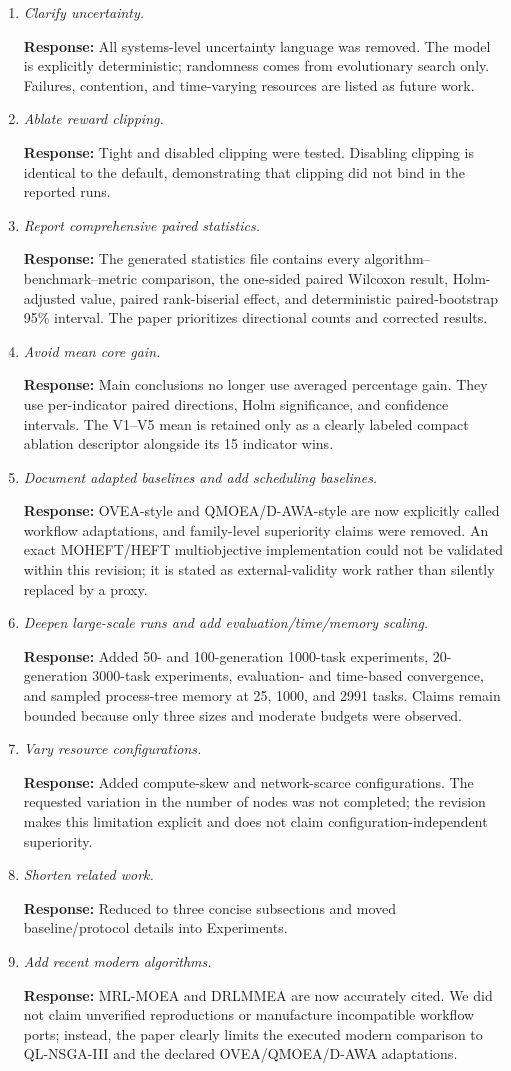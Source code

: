 \documentclass[11pt]{article}
\newcommand{\response}[1]{\par\smallskip\noindent\textcolor{blue!55!black}{\textbf{Response:} #1}\par\medskip}
\begin{document}
\begin{enumerate}
\item \emph{Clarify uncertainty.}
\response{All systems-level uncertainty language was removed. The model is explicitly deterministic; randomness comes from evolutionary search only. Failures, contention, and time-varying resources are listed as future work.}

\item \emph{Ablate reward clipping.}
\response{Tight and disabled clipping were tested. Disabling clipping is identical to the default, demonstrating that clipping did not bind in the reported runs.}

\item \emph{Report comprehensive paired statistics.}
\response{The generated statistics file contains every algorithm--benchmark--metric comparison, the one-sided paired Wilcoxon result, Holm-adjusted value, paired rank-biserial effect, and deterministic paired-bootstrap 95\% interval. The paper prioritizes directional counts and corrected results.}

\item \emph{Avoid mean core gain.}
\response{Main conclusions no longer use averaged percentage gain. They use per-indicator paired directions, Holm significance, and confidence intervals. The V1--V5 mean is retained only as a clearly labeled compact ablation descriptor alongside its 15 indicator wins.}

\item \emph{Document adapted baselines and add scheduling baselines.}
\response{OVEA-style and QMOEA/D-AWA-style are now explicitly called workflow adaptations, and family-level superiority claims were removed. An exact MOHEFT/HEFT multiobjective implementation could not be validated within this revision; it is stated as external-validity work rather than silently replaced by a proxy.}

\item \emph{Deepen large-scale runs and add evaluation/time/memory scaling.}
\response{Added 50- and 100-generation 1000-task experiments, 20-generation 3000-task experiments, evaluation- and time-based convergence, and sampled process-tree memory at 25, 1000, and 2991 tasks. Claims remain bounded because only three sizes and moderate budgets were observed.}

\item \emph{Vary resource configurations.}
\response{Added compute-skew and network-scarce configurations. The requested variation in the number of nodes was not completed; the revision makes this limitation explicit and does not claim configuration-independent superiority.}

\item \emph{Shorten related work.}
\response{Reduced to three concise subsections and moved baseline/protocol details into Experiments.}

\item \emph{Add recent modern algorithms.}
\response{MRL-MOEA and DRLMMEA are now accurately cited. We did not claim unverified reproductions or manufacture incompatible workflow ports; instead, the paper clearly limits the executed modern comparison to QL-NSGA-III and the declared OVEA/QMOEA/D-AWA adaptations.}
\end{enumerate}
\end{document}
